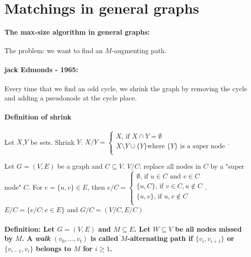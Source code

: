 \documentclass[main]{subfiles}
\begin{document}

\section{Matchings in general graphs}

\paragraph{The max-size algorithm in general graphs:}
The problem: we want to find an $M$-augmenting path.

\paragraph{jack Edmonds - 1965:} Every time that we find an odd cycle, we
shrink the graph by removing the cycle and adding a pseudonode at the cycle
place.

\paragraph{Definition of shrink} Let $X$,$Y$ be sets.
Shrink $Y$: $X/Y =
\begin{cases}
  X\text{, if } X \cap Y = \emptyset\\
  X \setminus Y \cup \{Y\} \text{where $\{Y\}$ is a super node} \\
\end{cases}$.

Let $G=(V,E)$ be a graph and $C \subseteq V$. $V/C$: replace all nodes in $C$
by a "super node" $C$.
For $e =\{u,v\} \in E$, then $e/C =
\begin{cases}
  \emptyset \text{, if } u \in C \text{ and } v \in C \\
  \{u,C\} \text{, if } v \in C, u \notin C \\
  \{u,v\} \text{, if } u,v \notin C\\
\end{cases}$.
$E/C = \{ e/C: e \in E\}$ and $G/C = (V/C, E/C)$

\paragraph{Definition: Let $G=(V,E)$ and $M \subseteq E$. Let $W \subseteq V$
be all nodes missed by $M$. A \emph{walk} $(v_0, \dots, v_t)$ is called
$M$-alternating path if $\{v_i, v_{i+1}\}$ or $\{v_{i-1}, v_i\}$ belongs to
$M$ for $i \geq 1$.}
\end{document}
